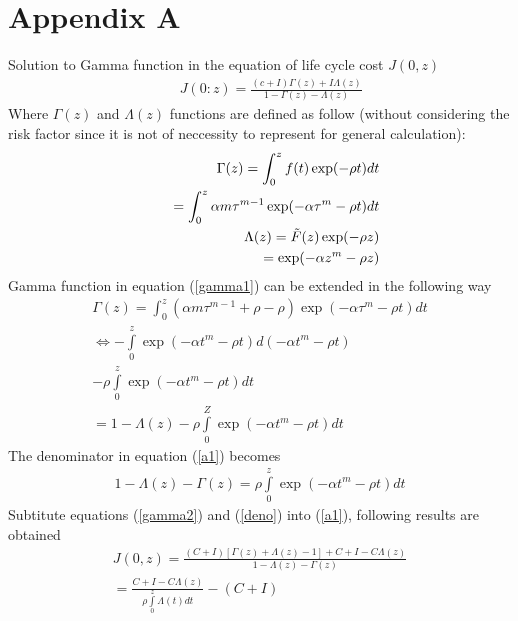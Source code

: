 
\chapter{Appendix A}
\label{Appendix A}
Solution to Gamma function in the equation of life cycle cost $J(0,z)$
\begin{eqnarray}
&& J(0:z)= \frac{(c+I)\Gamma(z)+I \Lambda(z)}{1-\Gamma(z)-\Lambda(z)} \label{a1}
\end{eqnarray}
Where $\Gamma(z)$ and $\Lambda(z)$ functions are defined as follow (without considering the risk factor since it is not of neccessity to represent for general calculation):
\begin{eqnarray}
&& \Gamma(z)=\int_0^{z} f(t)\exp(-\rho t)dt \nonumber \\
&& \hspace{5mm}= \int_0^z \alpha m\tau^{m-1}\exp(-\alpha \tau^m-\rho t)dt \label{gamma1}\\
&& \Lambda(z)= \tilde{F}(z) \exp(-\rho z)  \nonumber \\
&& \hspace{5mm} =\exp(-\alpha z^m-\rho z)  \label{alpha1}
\end{eqnarray}
Gamma function in equation (\ref{gamma1}) can be extended in the following way
\begin{eqnarray}
\Gamma(z)= \int_0^z (\alpha m\tau^{m-1}+\rho-\rho)\exp(-\alpha \tau^m-\rho t)dt \label{gamma11}\\
 \Leftrightarrow  - \int\limits_0^z {\exp ( - \alpha t^m  - \rho t)d( - \alpha t^m  - \rho t)}\nonumber \\ 
- \rho \int\limits_0^z {\exp ( - \alpha t^m  - \rho t)dt}\nonumber  \\ 
 = 1 - \Lambda (z) - \rho \int\limits_0^Z {\exp ( - \alpha t^m  - \rho t)dt} \label{gamma2}
\end{eqnarray}
The denominator in equation (\ref{a1}) becomes
\begin{eqnarray}
1 - \Lambda (z) - \Gamma (z) = \rho \int\limits_0^z {\exp ( - \alpha t^m  - \rho t)dt} \label{deno} 
\end{eqnarray}
Subtitute equations (\ref{gamma2}) and (\ref{deno}) into (\ref{a1}), following results are obtained
\begin{eqnarray}
J(0,z) = \frac{{(C + I)\left[ {\Gamma (z) + \Lambda (z) - 1} \right] + C + I - C\Lambda (z)}}{{1 - \Lambda (z) - \Gamma (z)}} \label{a2}\\
=\frac{{C + I - C\Lambda (z)}}{{\rho \int\limits_0^z {\Lambda (t)dt} }} - (C + I) \label{a3}
\end{eqnarray}
